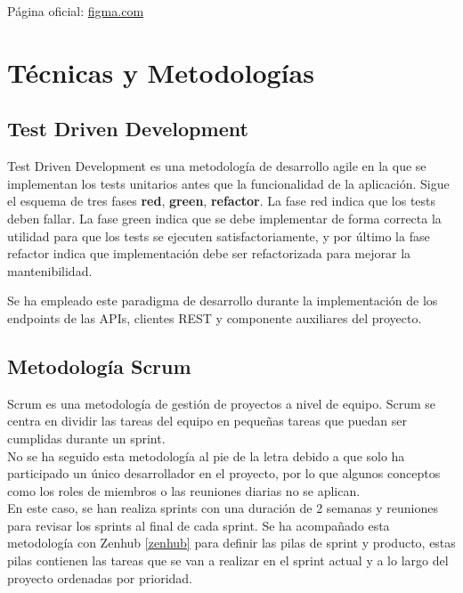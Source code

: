 Página oficial: \href{figma.com}{figma.com}

\section{Técnicas y Metodologías}

\subsection{Test Driven Development}\label{test_driven_dev}
Test Driven Development \cite{TDD} es una metodología de desarrollo agile en la que se implementan los tests unitarios antes que la funcionalidad de la aplicación. Sigue el esquema de tres fases \textbf{red}, \textbf{green}, \textbf{refactor}. La fase red indica que los tests deben fallar. La fase green indica que se debe implementar de forma correcta la utilidad para que los tests se ejecuten satisfactoriamente, y por último la fase refactor indica que implementación debe ser refactorizada para mejorar la mantenibilidad. 

Se ha empleado este paradigma de desarrollo durante la implementación de los endpoints de las APIs, clientes REST y componente auxiliares del proyecto.

\subsection{Metodología Scrum}
Scrum es una metodología de gestión de proyectos a nivel de equipo. Scrum se centra en dividir las tareas del equipo en pequeñas tareas que puedan ser cumplidas durante un sprint.\\
No se ha seguido esta metodología al pie de la letra debido a que solo ha participado un único desarrollador en el proyecto, por lo que algunos conceptos como los roles de miembros o las reuniones diarias no se aplican.\\
En este caso, se han realiza sprints con una duración de 2 semanas y reuniones para revisar los sprints al final de cada sprint. Se ha acompañado esta metodología con Zenhub \ref{zenhub} para definir las pilas de sprint y producto, estas pilas contienen las tareas que se van a realizar en el sprint actual y a lo largo del proyecto ordenadas por prioridad. 



